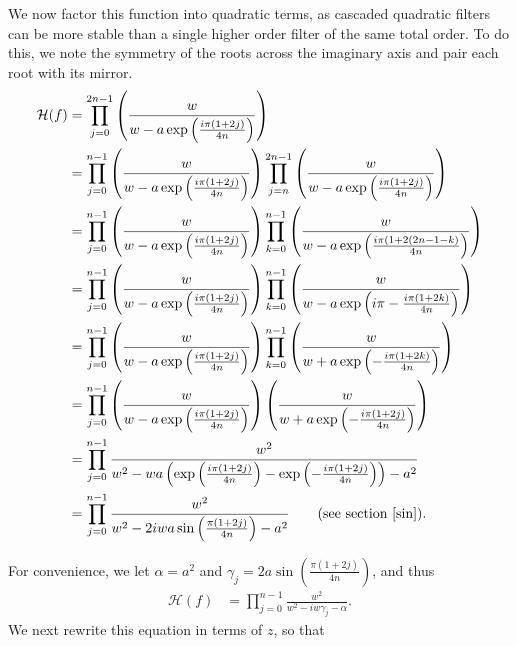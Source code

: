 \documentclass[a4paper]{article}
\begin{document}
We now factor this function into quadratic terms, as cascaded quadratic filters
can be more stable than a single higher order filter of the same total order.
To do this, we note the symmetry of the roots across the imaginary axis and
pair each root with its mirror.
\begin{align}
    \mathcal{H}(f) &= \prod_{j=0}^{2 n - 1} \left(\frac{w}{w - a\exp\left(\frac{i \pi (1 + 2 j)}{4 n}\right)}\right) \\
        &= \prod_{j=0}^{n - 1} \left(\frac{w}{w - a\exp\left(\frac{i \pi (1 + 2 j)}{4 n}\right)}\right)
           \prod_{j=n}^{2 n - 1} \left(\frac{w}{w - a\exp\left(\frac{i \pi (1 + 2 j)}{4 n}\right)}\right) \\
        &= \prod_{j=0}^{n - 1} \left(\frac{w}{w - a\exp\left(\frac{i \pi (1 + 2 j)}{4 n}\right)}\right)
           \prod_{k=0}^{n - 1} \left(\frac{w}{w - a\exp\left(\frac{i \pi (1 + 2 (2 n - 1 - k)}{4 n}\right)}\right) \\
        &= \prod_{j=0}^{n - 1} \left(\frac{w}{w - a\exp\left(\frac{i \pi (1 + 2 j)}{4 n}\right)}\right)
           \prod_{k=0}^{n - 1} \left(\frac{w}{w - a\exp\left(i \pi-\frac{i \pi (1 + 2 k)}{4 n}\right)}\right) \\
        &= \prod_{j=0}^{n - 1} \left(\frac{w}{w - a\exp\left(\frac{i \pi (1 + 2 j)}{4 n}\right)}\right)
           \prod_{k=0}^{n - 1} \left(\frac{w}{w + a\exp\left(-\frac{i \pi (1 + 2 k)}{4 n}\right)}\right) \\
        &= \prod_{j=0}^{n - 1}
           \left(\frac{w}{w - a\exp\left(\frac{i \pi (1 + 2 j)}{4 n}\right)}\right)
           \left(\frac{w}{w + a\exp\left(-\frac{i \pi (1 + 2 j)}{4 n}\right)}\right) \\
        &= \prod_{j=0}^{n - 1}
           \frac{w^2}{w^2 - w a \left(\exp\left(\frac{i \pi (1 + 2 j)}{4 n}\right) -
           \exp\left(-\frac{i \pi (1 + 2 j)}{4 n}\right)\right) - a^2} \label{eq:high_pass_quadratic1} \\
        &= \prod_{j=0}^{n - 1}
           \frac{w^2}{w^2 - 2 i w a \sin\left(\frac{\pi (1 + 2 j)}{4 n}\right) - a^2} \qquad\textrm{(see section \ref{sin})}. \label{eq:high_pass_quadratic2}
\end{align}


For convenience, we let $\alpha = a^2$ and $\gamma_j = 2 a \sin\left(\frac{\pi (1 + 2 j)}{4 n}\right)$, and thus 
\begin{align}
    \mathcal{H}(f) &= \prod_{j=0}^{n - 1}\frac{w^2}
        {w^2 - i w \gamma_j - \alpha}.
\end{align}
We next rewrite this equation in terms of $z$, so that
\end{document}
